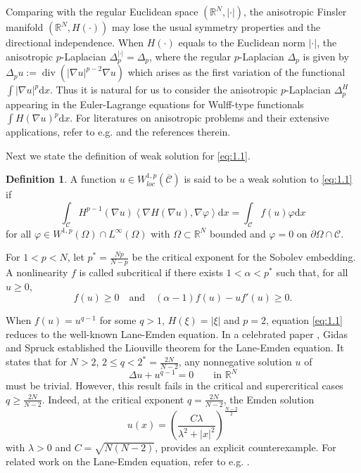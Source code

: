 \documentclass[12pt]{amsart}
\theoremstyle{definition}
\newtheorem{defn}[thm]{Definition}
\theoremstyle{remark}
\theoremstyle{conclusion}
\theoremstyle{conjecture}
\numberwithin{equation}{section}
\begin{document}
\smallskip

Comparing with the regular Euclidean space $(\mathbb{R}^{N},|\cdot|)$, the anisotropic Finsler manifold $(\mathbb{R}^{N},H(\cdot))$ may lose the usual symmetry properties and the directional independence. When $H(\cdot)$ equals to the Euclidean norm $|\cdot|$, the anisotropic $p$-Laplacian $\Delta ^{|\cdot|}_{p}=\Delta_{p}$, where the regular $p$-Laplacian $\Delta_{p}$ is given by $\Delta_{p}u:=\operatorname{div}\left(|\nabla u|^{p-2}\nabla u\right)$ which arises as the first variation of the functional $\int|\nabla u|^p\mathrm{d}x$. Thus it is natural for us to consider the anisotropic $p$-Laplacian $\Delta ^{H}_{p}$ appearing in the Euler-Lagrange equations for Wulff-type functionals $\int H(\nabla u)^p\mathrm{d}x$. For literatures on anisotropic problems and their extensive applications, refer to e.g. \cite{ACF,BFK,BC,CRS,CFR,CL1,CL2,CFV,DGL,DP,DPV,FF,FM,Taylor,WX1,WX2,Wulff,XG,ZZ} and the references therein.

\medskip

Next we state the definition of weak solution for \eqref{eq:1.1}.
\begin{defn}
A function $u\in W^{1,p}_{loc}(\overline{\mathcal{C}})$ is said to be a weak solution to \eqref{eq:1.1} if
\begin{equation}\label{def weak solu}
 \int_{\mathcal{C}} H^{p-1}(\nabla u)\left\langle \nabla H(\nabla u),\nabla \varphi\right\rangle\mathrm{d}x= \int_{\mathcal{C}}f(u)\varphi\mathrm{d}x
\end{equation}
for all $\varphi\in W^{1,p}(\Omega)\cap L^{\infty}(\Omega)$ with $\Omega\subset\mathbb{R}^N$ bounded and $\varphi=0$ on $\partial\Omega\cap\mathcal{C}$.
\end{defn}
For $1<p<N$, let $p^*=\frac{Np}{N-p}$ be the critical exponent for the Sobolev embedding. A nonlinearity $f$ is called subcritical if there exists $1<\alpha<p^*$ such that, for all $u\geq0$,
\begin{equation}\label{subcritical}
f(u)\geq0 \quad \text{and} \quad (\alpha-1)f(u)-uf'(u)\geq0.
\end{equation}


When $f(u)=u^{q-1}$ for some $q>1$, $H(\xi)=|\xi|$ and $p=2$, equation \eqref{eq:1.1} reduces to the well-known Lane-Emden equation. In a celebrated paper \cite{GS}, Gidas and Spruck established the Liouville theorem for the Lane-Emden equation. It states that for $N>2$, $2\leq q<2^*=\frac{2N}{N-2}$, any nonnegative solution $u$ of
$$\Delta u+u^{q-1}=0\qquad \text{in}\,\,\mathbb{R}^N$$
must be trivial. However, this result fails in the critical and supercritical cases $q\geq\frac{2N}{N-2}$. Indeed, at the critical exponent $q=\frac{2N}{N-2}$, the Emden solution
$$u(x)=\left(\frac{C\lambda}{\lambda^2+|x|^2}\right)^{\frac{N-2}{2}}$$
with $\lambda>0$ and $C=\sqrt{N(N-2)}$, provides an explicit counterexample. For related work on the Lane-Emden equation, refer to e.g. \cite{BV,CGS1,PS}.
\end{document}
